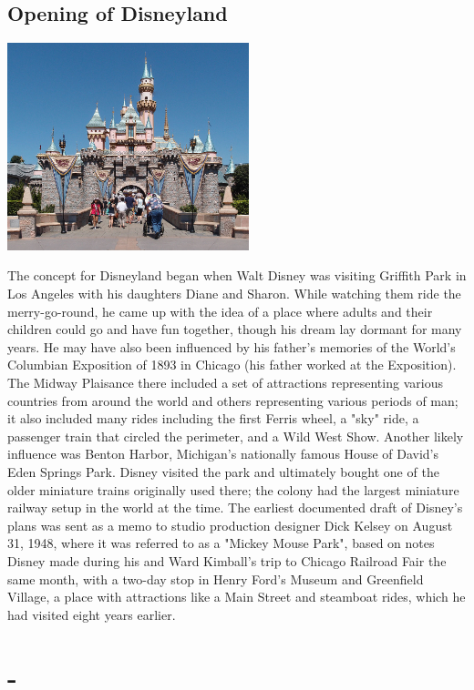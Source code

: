 \documentclass[11pt]{report}
\begin{document}
\subsection{Opening of Disneyland}
\vspace{2mm}\begin{center}\includegraphics[width=7cm]{./img/disneyland.jpg}\end{center}
The concept for Disneyland began when Walt Disney was visiting Griffith Park in Los Angeles with his daughters Diane and Sharon. While watching them ride the merry-go-round, he came up with the idea of a place where adults and their children could go and have fun together, though his dream lay dormant for many years. He may have also been influenced by his father's memories of the World's Columbian Exposition of 1893 in Chicago (his father worked at the Exposition). The Midway Plaisance there included a set of attractions representing various countries from around the world and others representing various periods of man; it also included many rides including the first Ferris wheel, a "sky" ride, a passenger train that circled the perimeter, and a Wild West Show. Another likely influence was Benton Harbor, Michigan's nationally famous House of David's Eden Springs Park. Disney visited the park and ultimately bought one of the older miniature trains originally used there; the colony had the largest miniature railway setup in the world at the time. The earliest documented draft of Disney's plans was sent as a memo to studio production designer Dick Kelsey on August 31, 1948, where it was referred to as a "Mickey Mouse Park", based on notes Disney made during his and Ward Kimball's trip to Chicago Railroad Fair the same month, with a two-day stop in Henry Ford's Museum and Greenfield Village, a place with attractions like a Main Street and steamboat rides, which he had visited eight years earlier.
\section{-}
\end{document}
